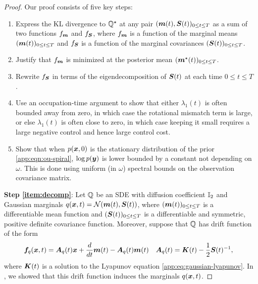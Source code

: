 \begin{proof}
Our proof consists of five key steps:
\begin{enumerate}[label=(\roman*)]
    \item\label{item:decomp} Express the KL divergence to $\mathbb{Q}^\star$ at any pair $(\boldsymbol{m}(t), \boldsymbol{S}(t))_{0 \leq t \leq T}$ as a sum of two functions $f_{\boldsymbol{m}}$ and $f_{\boldsymbol{S}}$, where $f_{\boldsymbol{m}}$ is a function of the marginal means $(\boldsymbol{m}(t))_{0 \leq t \leq T}$ and $f_{\boldsymbol{S}}$ is a function of the marginal covariances $(\boldsymbol{S}(t))_{0 \leq t \leq T}$.
    
    \item\label{item:mean-path} Justify that $f_{\boldsymbol{m}}$ is minimized at the posterior mean $(\boldsymbol{m}^\star(t))_{0 \leq t \leq T}$.

    \item\label{item:eigen} Rewrite $f_{\boldsymbol{S}}$ in terms of the eigendecomposition of $\boldsymbol{S}(t)$ at each time $0 \leq t \leq T$.

    \item\label{item:occupation-time} Use an occupation-time argument to show that either $\lambda_1(t)$ is often bounded away from zero, in which case the rotational mismatch term is large, or else $\lambda_1(t)$ is often close to zero, in which case keeping it small requires a large negative control and hence large control cost.

    \item \label{item:indpendence} Show that when $p(\boldsymbol{x}, 0)$ is the stationary distribution of the prior \eqref{app:eqn:ou-spiral}, $\log p(\boldsymbol{y})$ is lower bounded by a constant not depending on $\omega$. 
    This is done using uniform (in $\omega$) spectral bounds on the observation covariance matrix.
\end{enumerate}

\textbf{Step \ref{item:decomp}}:
Let $\mathbb{Q}$ be an SDE with diffusion coefficient $\mathbb{I}_2$ and Gaussian marginals $q(\boldsymbol{x}, t) = \mathcal{N}(\boldsymbol{m}(t), \boldsymbol{S}(t))$, where $(\boldsymbol{m}(t))_{0 \leq t \leq T}$ is a differentiable mean function and $(\boldsymbol{S}(t))_{0 \leq t \leq T}$ is a differentiable and symmetric, positive definite covariance function. 
Moreover, suppose that $\mathbb{Q}$ has drift function of the form 
\begin{equation*}
    \begin{aligned}
    \boldsymbol{f}_q(\boldsymbol{x}, t) = \boldsymbol{A}_q(t) \boldsymbol{x} + \frac{d}{dt} \boldsymbol{m}(t) - \boldsymbol{A}_q(t) \boldsymbol{m}(t) \quad 
    \boldsymbol{A}_q(t) = \boldsymbol{K}(t) - \frac{1}{2}\boldsymbol{S}(t)^{-1},
    \end{aligned}
\end{equation*}
where $\boldsymbol{K}(t)$ is a solution to the Lyapunov equation \cref{app:eq:gaussian-lyapunov}. In , we showed that this drift function induces the marginals $q(\boldsymbol{x}, t)$.


\end{proof}
